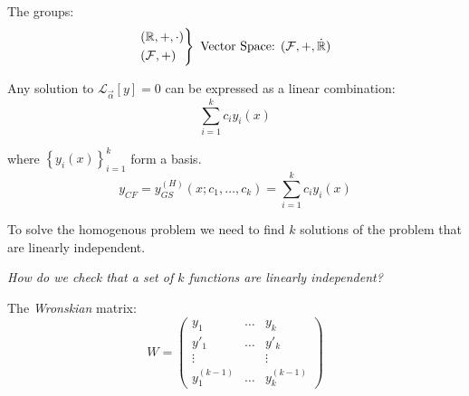 \documentclass[twoside]{scrartcl}
\begin{document}
The groups:
\[\begin{rcases*}(\R, +, \cdot) \\ (\mathcal{F}, +)\\	
\end{rcases*}
\text{ Vector Space: }(\mathcal{F},+,\dot{\R}) \]

Any solution to $\mathcal{L}_{\vec{\alpha}}[y] = 0$ can be expressed as a linear combination:
\[\sum_{i=1}^kc_iy_i(x)\]

where $\left\{y_i(x)\right\}_{i=1}^k$ form a basis. 
\[y_{CF} = y_{GS}^{(H)}(x;c_1,\dots,c_k) = \sum_{i=1}^kc_iy_i(x)\]

To solve the homogenous problem we need to find $k$ solutions of the problem that are linearly independent. 

\emph{How do we check that a set of $k$ functions are linearly independent?}\\

\begin{definition}
The \emph{Wronskian} matrix:
\[W = 
\begin{pmatrix}
y_1 & \dots & y_k\\
y'_1 & \dots & y'_k\\
\vdots & & \vdots\\
y^{(k-1)}_1 & \dots & y^{(k-1)}_k	
\end{pmatrix}
\]	
\end{definition}
\end{document}
